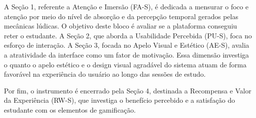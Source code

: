 A Seção 1, referente a Atenção e Imersão (FA-S), é dedicada a mensurar o foco e
atenção por meio do nível de absorção e da percepção temporal gerados pelas
mecânicas lúdicas. O objetivo deste bloco é avaliar se a plataforma conseguiu
reter o estudante. A Seção 2, que aborda a Usabilidade Percebida (PU-S), foca no
esforço de interação. A Seção 3, focada no Apelo Visual e Estético (AE-S),
avalia a atratividade da interface como um fator de motivação. Essa dimensão
investiga o quanto o apelo estético e o design visual agradável do sistema atuam
de forma favorável na experiência do usuário ao longo das sessões de estudo.

Por fim, o instrumento é encerrado pela Seção 4, destinada a Recompensa e Valor
da Experiência (RW-S), que investiga o benefício percebido e a satisfação do
estudante com os elementos de gamificação.
